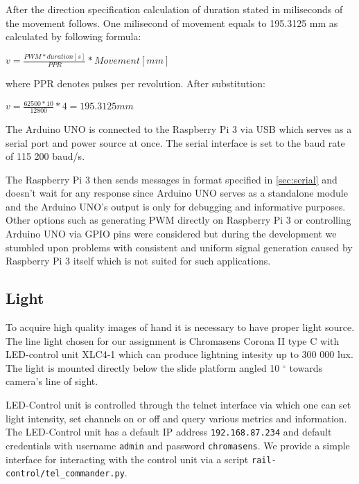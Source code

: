 After the direction specification calculation of duration  stated in miliseconds of the movement follows. One milisecond of movement equals to 195.3125 mm as calculated by following formula:\\
\begin{centering}
    $v = \frac{PWM * duration [s]}{PPR} * Movement [mm]$ \\
\end{centering}
where PPR denotes pulses per revolution. After substitution: \\
\begin{centering}
    $v = \frac{62500 * 10}{12800} * 4 = 195.3125 mm$ \\
\end{centering}

The Arduino UNO is connected to the Raspberry Pi 3 via USB which serves as a serial port and power source at once. The serial interface is set to the baud rate of 115 200 baud/s.

The Raspberry Pi 3 then sends messages in format specified in \ref{sec:serial} and doesn't wait for any response since Arduino UNO serves as a standalone module and the Arduino UNO's output is only for debugging and informative purposes. Other options such as generating PWM directly on Raspberry Pi 3 or controlling Arduino UNO via GPIO pins were considered but during the development we stumbled upon problems with consistent and uniform signal generation caused by Raspberry Pi 3 itself which is not suited for such applications.

\subsection{Light}
To acquire high quality images of hand it is necessary to have proper light source. The line light chosen for our assignment is Chromasens Corona II type C with LED-control unit XLC4-1 which can produce lightning intesity up to 300 000 lux. The light is mounted directly below the slide platform angled 10 $^{\circ}$ towards camera's line of sight.

LED-Control unit is controlled through the telnet interface via which one can set light intensity, set channels on or off and query various metrics and information. The LED-Control unit has a default IP address \texttt{192.168.87.234} and default credentials with username \texttt{admin} and password \texttt{chromasens}. We provide a simple interface for interacting with the control unit via a script \texttt{rail-control/tel\_commander.py}.

